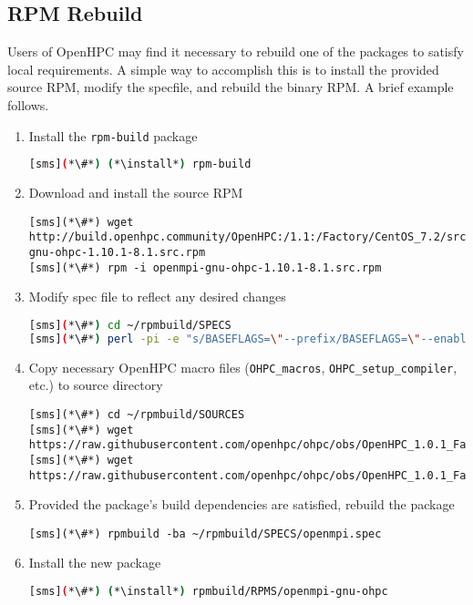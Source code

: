 \subsection{RPM Rebuild}  \label{appendix:rpmbuild}

Users of OpenHPC may find it necessary to rebuild one of the packages to satisfy
local requirements. A simple way to accomplish this is to install the provided
source RPM, modify the specfile, and rebuild the binary RPM. A brief example
follows.

\begin{enumerate}
\item Install the \texttt{rpm-build} package

\begin{lstlisting}[language=bash,keywords={}]
[sms](*\#*) (*\install*) rpm-build
\end{lstlisting}

\item Download and install the source RPM 
\begin{lstlisting}
[sms](*\#*) wget http://build.openhpc.community/OpenHPC:/1.1:/Factory/CentOS_7.2/src/openmpi-gnu-ohpc-1.10.1-8.1.src.rpm
[sms](*\#*) rpm -i openmpi-gnu-ohpc-1.10.1-8.1.src.rpm
\end{lstlisting}

\item Modify spec file to reflect any desired changes

\begin{lstlisting}[language=bash,keywords={}]
[sms](*\#*) cd ~/rpmbuild/SPECS
[sms](*\#*) perl -pi -e "s/BASEFLAGS=\"--prefix/BASEFLAGS=\"--enable-mpi-thread-multiple --prefix/" openmpi.spec
\end{lstlisting}

\item Copy necessary OpenHPC macro files (\texttt{OHPC\_macros}, 
\texttt{OHPC\_setup\_compiler}, etc.) to source directory

\begin{lstlisting}
[sms](*\#*) cd ~/rpmbuild/SOURCES
[sms](*\#*) wget https://raw.githubusercontent.com/openhpc/ohpc/obs/OpenHPC_1.0.1_Factory/components/OHPC_macros
[sms](*\#*) wget https://raw.githubusercontent.com/openhpc/ohpc/obs/OpenHPC_1.0.1_Factory/components/OHPC_setup_compiler
\end{lstlisting}

\item Provided the package's build dependencies are satisfied, rebuild the
package

\begin{lstlisting}
[sms](*\#*) rpmbuild -ba ~/rpmbuild/SPECS/openmpi.spec
\end{lstlisting}

\item Install the new package

\begin{lstlisting}[language=bash,keywords={}]
[sms](*\#*) (*\install*) rpmbuild/RPMS/openmpi-gnu-ohpc
\end{lstlisting}
\end{enumerate}
